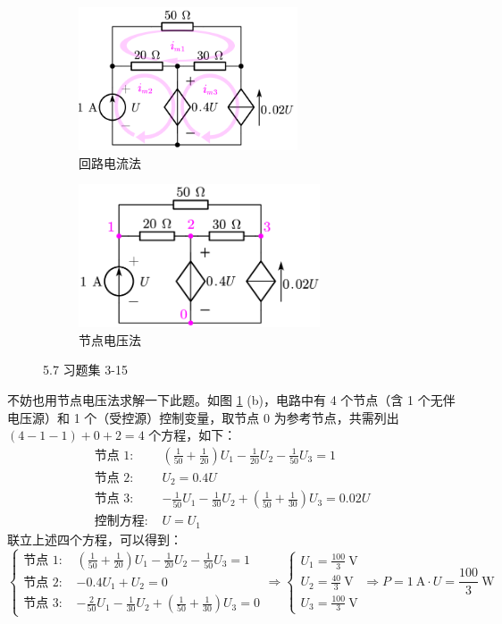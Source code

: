 \documentclass[UTF8]{report}
\theoremstyle{MyLineTheoremStyle} %
\theoremstyle{MyBlockTheoremStyle} %
\theoremstyle{MySubsubsectionStyle} %
\begin{document}
\begin{figure}[H]\centering
\begin{subfigure}[t]{0.5\columnwidth}\centering
    \includegraphics[height=120pt]{assets/5/5.7 (1).png}
    \caption{ 回路电流法 }
\end{subfigure}\hfill
\begin{subfigure}[t]{0.5\columnwidth}\centering
    \includegraphics[height=120pt]{assets/5/5.7 (2).png}
    \caption{ 节点电压法 }
\end{subfigure}
\caption{ 5.7 习题集 3-15 }\label{5.7 习题集 3-15}
\end{figure}

不妨也用节点电压法求解一下此题。如图 \ref{5.7 习题集 3-15} (b)，电路中有 4 个节点（含 1 个无伴电压源）和 1 个（受控源）控制变量，取节点 0 为参考节点，共需列出 $ (4 - 1 - 1) + 0 + 2 = 4$ 个方程，如下：
\begin{align}
\text{节点 1: } & \left(\frac{1}{50} + \frac{1}{20}\right) U_1 - \frac{1}{20}U_2 - \frac{1}{50}U_3 = 1 \\ 
\text{节点 2: } & U_2 = 0.4 U \\
\text{节点 3: } & - \frac{1}{50}U_1 - \frac{1}{30}U_2 + \left(\frac{1}{50} + \frac{1}{30}\right)U_3 = 0.02 U \\ 
\text{控制方程: } & U = U_1
\end{align}
联立上述四个方程，可以得到：
\begin{equation}
\begin{cases}
    \text{节点 1: } & \left(\frac{1}{50} + \frac{1}{20}\right) U_1 - \frac{1}{20}U_2 - \frac{1}{50}U_3 = 1 \\ 
    \text{节点 2: } & -0.4 U_1 + U_2 = 0 \\
    \text{节点 3: } & - \frac{2}{50}U_1 - \frac{1}{30}U_2 + \left(\frac{1}{50} + \frac{1}{30}\right)U_3 = 0
\end{cases}
\Longrightarrow 
\begin{cases}
    U_1 = \frac{100}{3} \ \mathrm{V}\\ 
    U_2 = \frac{40}{3} \ \mathrm{V}\\ 
    U_3 = \frac{100}{3} \ \mathrm{V}
\end{cases}
\Longrightarrow P = 1 \ \mathrm{A}\cdot U = \frac{100}{3} \ \mathrm{W}
\end{equation}
\end{document}
